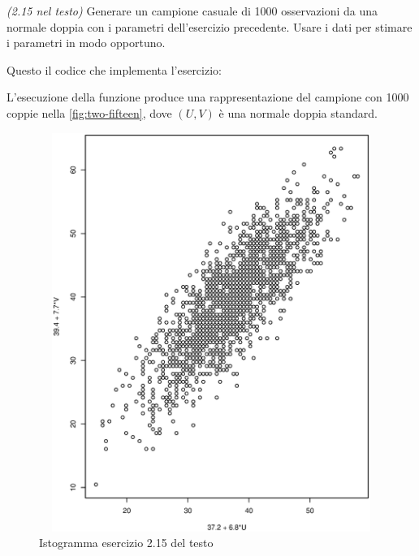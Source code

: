 \begin{exercise}\emph{(2.15 nel testo)}
  Generare un campione casuale di 1000 osservazioni da una normale doppia con i
  parametri dell'esercizio precedente. Usare i dati per stimare i parametri in modo
  opportuno.  
\end{exercise}
Questo il codice che implementa l'esercizio:

L'esecuzione della funzione produce una rappresentazione del campione
con 1000 coppie nella \autoref{fig:two-fifteen}, dove $(U, V)$ \`e una
normale doppia standard.
\begin{figure}[htb]
\centering
\includegraphics[height=13cm,width=13cm]{r-sources/exercises/chapter-two/two-fifteen.ps}
\caption{Istogramma esercizio 2.15 del testo}
\label{fig:two-fifteen}
\end{figure}
